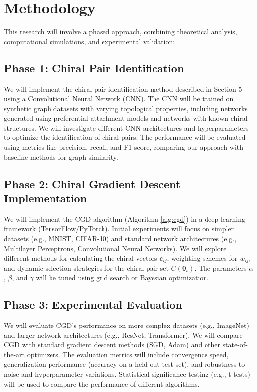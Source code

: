 \documentclass[12pt, a4paper]{article}
\begin{document}
\section{Methodology}

This research will involve a phased approach, combining theoretical analysis, computational simulations, and experimental validation:

\subsection{Phase 1: Chiral Pair Identification}

We will implement the chiral pair identification method described in Section 5 using a Convolutional Neural Network (CNN). The CNN will be trained on synthetic graph datasets with varying topological properties, including networks generated using preferential attachment models and networks with known chiral structures. We will investigate different CNN architectures and hyperparameters to optimize the identification of chiral pairs. The performance will be evaluated using metrics like precision, recall, and F1-score, comparing our approach with baseline methods for graph similarity.

\subsection{Phase 2: Chiral Gradient Descent Implementation}

We will implement the CGD algorithm (Algorithm \ref{alg:cgd}) in a deep learning framework (TensorFlow/PyTorch).  Initial experiments will focus on simpler datasets (e.g., MNIST, CIFAR-10) and standard network architectures (e.g., Multilayer Perceptrons, Convolutional Neural Networks). We will explore different methods for calculating the chiral vectors \(\mathbf{c}_{ij}\), weighting schemes for $w_{ij}$, and dynamic selection strategies for the chiral pair set \(C(\boldsymbol{\theta}_t)\). The parameters $\alpha$, $\beta$, and $\gamma$ will be tuned using grid search or Bayesian optimization.

\subsection{Phase 3: Experimental Evaluation}

We will evaluate CGD's performance on more complex datasets (e.g., ImageNet) and larger network architectures (e.g., ResNet, Transformer). We will compare CGD with standard gradient descent methods (SGD, Adam) and other state-of-the-art optimizers.  The evaluation metrics will include convergence speed, generalization performance (accuracy on a held-out test set), and robustness to noise and hyperparameter variations.  Statistical significance testing (e.g., t-tests) will be used to compare the performance of different algorithms.
\end{document}
